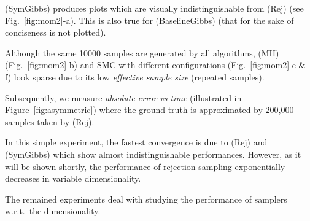 \documentclass[]{article}
\begin{document}
(SymGibbs) produces plots which are visually indistinguishable 
from (Rej) (see Fig.~\ref{fig:mom2}-a).
This is also true for (BaselineGibbs) (that for the sake of conciseness is not plotted).

Although the same 10000 samples are generated by all algorithms, (MH) 
(Fig.~\ref{fig:mom2}-b) and SMC with different configurations (Fig.~\ref{fig:mom2}-e \& f) look sparse 
due to its low \emph{effective sample size} (repeated samples).








Subsequently, we measure \emph{absolute error vs time} 
(illustrated in Figure~\ref{fig:asymmetric})
where the ground truth is approximated by 200,000 samples taken by (Rej).

In this simple experiment, the fastest convergence is due to (Rej) and (SymGibbs) which show almost indistinguishable performances.
However, as it will be shown shortly, the performance of rejection sampling exponentially decreases in variable dimensionality.

The remained experiments deal with studying the performance of samplers w.r.t.\ the dimensionality.

\end{document}
